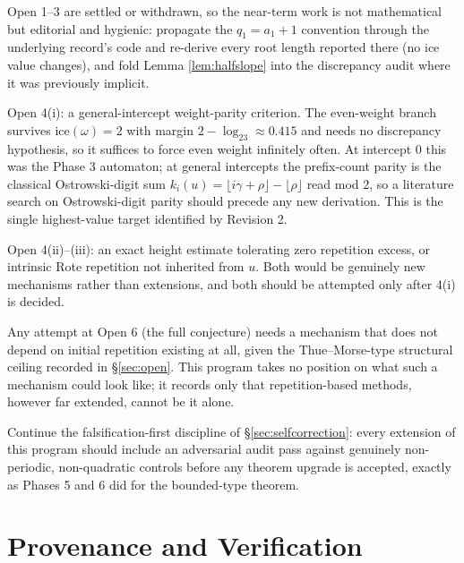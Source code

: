 \documentclass[11pt]{article}
\begin{document}
\begin{description}[leftmargin=3em,style=nextline]
\item[Near term.] Open 1--3 are settled or withdrawn, so the near-term work is not mathematical but
editorial and hygienic: propagate the $q_1=a_1+1$ convention through the underlying record's code
and re-derive every root length reported there (no $\text{ice}$ value changes), and fold Lemma
\ref{lem:halfslope} into the discrepancy audit where it was previously implicit.
\item[Medium term.] Open 4(i): a general-intercept weight-parity criterion. The even-weight branch
survives $\text{ice}(\omega)=2$ with margin $2-\log_23\approx0.415$ and needs no discrepancy
hypothesis, so it suffices to force even weight infinitely often. At intercept $0$ this was the
Phase 3 automaton; at general intercepts the prefix-count parity is the classical Ostrowski-digit
sum $k_i(u)=\lfloor i\gamma+\rho\rfloor-\lfloor\rho\rfloor$ read mod $2$, so a literature search on
Ostrowski-digit parity should precede any new derivation. This is the single highest-value target
identified by Revision 2.
\item[Longer term.] Open 4(ii)--(iii): an exact height estimate tolerating zero repetition excess,
or intrinsic Rote repetition not inherited from $u$. Both would be genuinely new mechanisms rather
than extensions, and both should be attempted only after 4(i) is decided.
\item[Structural.] Any attempt at Open 6 (the full conjecture) needs a mechanism that does not depend on initial repetition existing at all, given the Thue--Morse-type structural ceiling recorded in \S\ref{sec:open}. This program takes no position on what such a mechanism could look like; it records only that repetition-based methods, however far extended, cannot be it alone.
\item[Process.] Continue the falsification-first discipline of \S\ref{sec:selfcorrection}: every extension of this program should include an adversarial audit pass against genuinely non-periodic, non-quadratic controls before any theorem upgrade is accepted, exactly as Phases 5 and 6 did for the bounded-type theorem.
\end{description}

\section*{Provenance and Verification}
\end{document}
